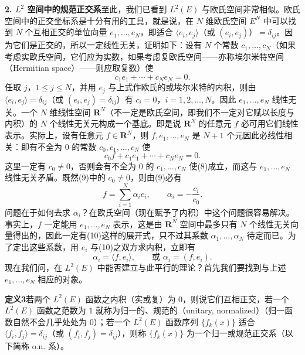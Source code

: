 \noindent\textbf{2. $L^2$ 空间中的规范正交系}\quad 至此，我们已看到 $L^2(E)$ 与欧氏空间非常相似。欧氏空间中的正交坐标系是十分有用的工具，就是说，在 $N$ 维欧氏空间 $E^N$ 中可以找到 $N$ 个互相正交的单位向量 $e_1,\ldots,e_N$，即适合 $\langle e_i,e_j\rangle$（或 $(e_i,e_j)$）$=\delta_{ij}$。因为它们是正交的，所以一定线性无关，证明如下：设有 $N$ 个常数 $c_1,\ldots,c_N$（如果考虑实欧氏空间，它们应为实数，如果考虑复欧氏空间——亦称埃尔米特空间（Hermitian space）——则应取复数）使
\begin{equation}
 c_1e_1+\cdots+c_Ne_N=0.
 \tag{8}
\end{equation}
任取 $j$，$1\le j\le N$，并用 $e_j$ 与上式作欧氏的或埃尔米特的内积，则由 $\langle e_i,e_j\rangle=\delta_{ij}$（或 $(e_i,e_j)=\delta_{ij}$）有 $c_i=0$，$i=1,2,\ldots,N$。因此 $e_1,\ldots,e_N$ 线性无关。一个 $N$ 维线性空间 $\mathbf R^N$（不一定是欧氏空间，即我们不一定对它赋以长度与内积）的 $N$ 个线性无关元构成一个基底。即是说 $\mathbf R^N$ 的任意元 $f$ 必可用它们线性表示。实际上，设有任意元 $f\in\mathbf R^N$，则 $f,e_1,\ldots,e_N$ 是 $N+1$ 个元因此必线性相关：即有不全为 $0$ 的常数 $c_0,c_1,\ldots,c_N$ 使
\begin{equation}
 c_0f+c_1e_1+\cdots+c_Ne_N=0.
 \tag{9}
\end{equation}
这里一定有 $c_0\ne0$，否则会有不全为 $0$ 的 $c_1,\ldots,c_N$ 使(8)成立，而这与 $e_1,\ldots,e_N$ 线性无关矛盾。既然(9)中的 $c_0\ne0$，则由(9)必有
\begin{equation}
 f=\sum_{i=1}^N\alpha_i e_i,\qquad \alpha_i=-\frac{c_i}{c_0}.
 \tag{10}
\end{equation}
问题在于如何去求 $\alpha_i$？在欧氏空间（现在赋予了内积）中这个问题很容易解决。事实上，$f$ 一定能用 $e_1,\ldots,e_N$ 表示，这是由 $\mathbf R^N$ 空间中最多只有 $N$ 个线性无关向量得出的，因此一定有(10)这样的展开式，只不过其系数 $\alpha_1,\ldots,\alpha_N$ 待定而已。为了定出这些系数，用 $e_i$ 与(10)之双方求内积，立即有
\begin{equation}
 \alpha_i=\langle f,e_i\rangle,\qquad \text{或 }\alpha_i=(f,e_i).
 \tag{11}
\end{equation}
现在我们问，在 $L^2(E)$ 中能否建立与此平行的理论？首先我们要找到与上述 $e_1,\ldots,e_N$ 相应的对象。

\noindent\textbf{定义3}\quad 若两个 $L^2(E)$ 函数之内积（实或复）为 $0$，则说它们互相正交，若一个 $L^2(E)$ 函数之范数为 $1$ 就称为归一的、规范的（unitary, normalized）（归一函数自然不会几乎处处为 $0$）；若一个 $L^2(E)$ 函数序列 $\{f_k(x)\}$ 适合 $\langle f_i,f_j\rangle=\delta_{ij}$（或 $(f_i,f_j)=\delta_{ij}$），则称 $\{f_k(x)\}$ 为一个归一或规范正交系（以下简称 o.n. 系）。

